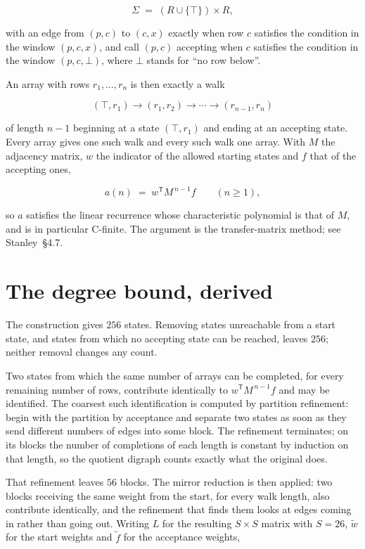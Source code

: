 \documentclass[11pt]{article}
\theoremstyle{definition}
\begin{document}
\[\Sigma \;=\; (R \cup \{\top\}) \times R,\]

with an edge from $(p,c)$ to $(c,x)$ exactly when row $c$ satisfies the condition in the window $(p,c,x)$, and call $(p,c)$ accepting when $c$ satisfies the condition in the window $(p,c,\bot)$, where $\bot$ stands for ``no row below''.

An array with rows $r_1,\dots,r_n$ is then exactly a walk

\[(\top,r_1) \to (r_1,r_2) \to \cdots \to (r_{n-1},r_n)\]

of length $n-1$ beginning at a state $(\top,r_1)$ and ending at an accepting state. Every array gives one such walk and every such walk one array. With $M$ the adjacency matrix, $w$ the indicator of the allowed starting states and $f$ that of the accepting ones,

\[a(n) \;=\; w^{\mathsf T} M^{\,n-1} f \qquad (n \ge 1),\]

so $a$ satisfies the linear recurrence whose characteristic polynomial is that of $M$, and is in particular C-finite. The argument is the transfer-matrix method; see Stanley~\S4.7.

\section{The degree bound, derived}

The construction gives $256$ states. Removing states unreachable from a start state, and states from which no accepting state can be reached, leaves $256$; neither removal changes any count.

Two states from which the same number of arrays can be completed, for every remaining number of rows, contribute identically to $w^{\mathsf T}M^{\,n-1}f$ and may be identified. The coarsest such identification is computed by partition refinement: begin with the partition by acceptance and separate two states as soon as they send different numbers of edges into some block. The refinement terminates; on its blocks the number of completions of each length is constant by induction on that length, so the quotient digraph counts exactly what the original does.

That refinement leaves $56$ blocks. The mirror reduction is then applied: two blocks receiving the same weight from the start, for every walk length, also contribute identically, and the refinement that finds them looks at edges coming in rather than going out. Writing $L$ for the resulting $S \times S$ matrix with $S = 26$, $\tilde w$ for the start weights and $\tilde f$ for the acceptance weights,
\end{document}
